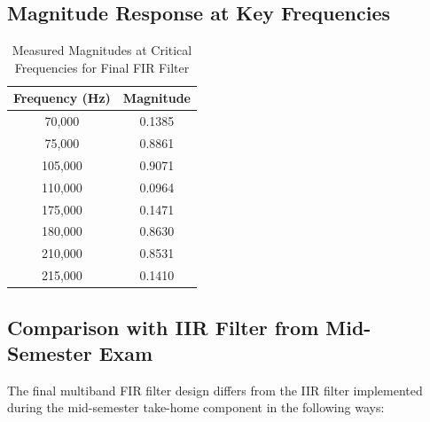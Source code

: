 \documentclass[12pt]{article}
\begin{document}
\subsection{Magnitude Response at Key Frequencies}

\begin{table}[H]
    \centering
    \begin{tabular}{|c|c|}
        \hline
        \textbf{Frequency (Hz)} & \textbf{Magnitude} \\
        \hline
        70,000   & 0.1385 \\
        75,000   & 0.8861 \\
        105,000  & 0.9071 \\
        110,000  & 0.0964 \\
        175,000  & 0.1471 \\
        180,000  & 0.8630 \\
        210,000  & 0.8531 \\
        215,000  & 0.1410 \\
        \hline
    \end{tabular}
    \caption{Measured Magnitudes at Critical Frequencies for Final FIR Filter}
    \label{tab:magnitude_values}
\end{table}






\subsection{Comparison with IIR Filter from Mid-Semester Exam}

The final multiband FIR filter design differs from the IIR filter implemented during the mid-semester take-home component in the following ways:
\end{document}
